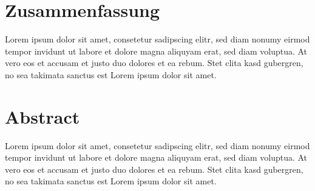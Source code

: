 \chapter*{Zusammenfassung}

Lorem ipsum dolor sit amet, consetetur sadipscing elitr, sed diam nonumy eirmod tempor invidunt ut labore et dolore magna aliquyam erat, sed diam voluptua. At vero eos et accusam et justo duo dolores et ea rebum. Stet clita kasd gubergren, no sea takimata sanctus est Lorem ipsum dolor sit amet.

\vspace{1cm}

\chapter*{Abstract}

Lorem ipsum dolor sit amet, consetetur sadipscing elitr, sed diam nonumy eirmod tempor invidunt ut labore et dolore magna aliquyam erat, sed diam voluptua. At vero eos et accusam et justo duo dolores et ea rebum. Stet clita kasd gubergren, no sea takimata sanctus est Lorem ipsum dolor sit amet.